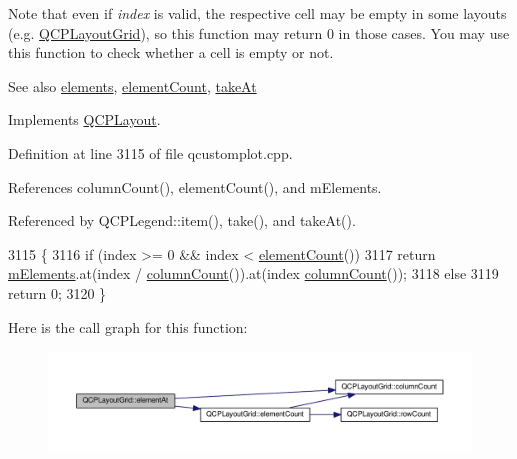 Note that even if {\itshape index} is valid, the respective cell may be empty in some layouts (e.\+g. \hyperlink{class_q_c_p_layout_grid}{Q\+C\+P\+Layout\+Grid}), so this function may return 0 in those cases. You may use this function to check whether a cell is empty or not.

\begin{DoxySeeAlso}{See also}
\hyperlink{class_q_c_p_layout_grid_ae9e24e01552f6667b6d05b12a54a4caa}{elements}, \hyperlink{class_q_c_p_layout_grid_aa682b1d36660478f665bab3c64e956a9}{element\+Count}, \hyperlink{class_q_c_p_layout_grid_acc1277394ff8a6432e111ff9463e6375}{take\+At} 
\end{DoxySeeAlso}


Implements \hyperlink{class_q_c_p_layout_afa73ca7d859f8a3ee5c73c9b353d2a56}{Q\+C\+P\+Layout}.



Definition at line 3115 of file qcustomplot.\+cpp.



References column\+Count(), element\+Count(), and m\+Elements.



Referenced by Q\+C\+P\+Legend\+::item(), take(), and take\+At().


\begin{DoxyCode}
3115                                                           \{
3116   \textcolor{keywordflow}{if} (index >= 0 && index < \hyperlink{class_q_c_p_layout_grid_aa682b1d36660478f665bab3c64e956a9}{elementCount}())
3117     \textcolor{keywordflow}{return} \hyperlink{class_q_c_p_layout_grid_a2ec4664bcfb5d479255e50f0c074f7c9}{mElements}.at(index / \hyperlink{class_q_c_p_layout_grid_ac39074eafd148b82d0762090f258189e}{columnCount}()).at(index %
      \hyperlink{class_q_c_p_layout_grid_ac39074eafd148b82d0762090f258189e}{columnCount}());
3118   \textcolor{keywordflow}{else}
3119     \textcolor{keywordflow}{return} 0;
3120 \}
\end{DoxyCode}


Here is the call graph for this function\+:\nopagebreak
\begin{figure}[H]
\begin{center}
\leavevmode
\includegraphics[width=350pt]{class_q_c_p_layout_grid_a26849ee5c47b4c940e8d65e8462f1065_cgraph}
\end{center}
\end{figure}





